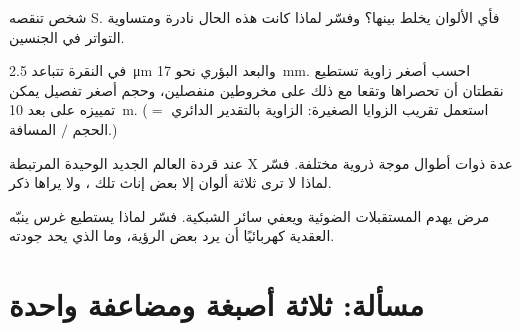 \begin{exercise}[$\star\star\star$]\label{exo:g11:the-eye:12}
شخص تنقصه  S. فأي الألوان يخلط بينها؟ وفسّر لماذا كانت هذه
الحال نادرة ومتساوية التواتر في الجنسين.
\end{exercise}

\begin{exercise}[$\star\star\star$]\label{exo:g11:the-eye:13}
 في النقرة تتباعد \qty{2.5}{\micro m} والبعد البؤري  نحو
\qty{17}{mm}. احسب أصغر زاوية تستطيع نقطتان أن تحصراها وتقعا مع ذلك
على مخروطين منفصلين، وحجم أصغر تفصيل يمكن تمييزه على بعد \qty{10}{m}.
(استعمل تقريب الزوايا الصغيرة: الزاوية بالتقدير الدائري $=$ الحجم $/$
المسافة.)
\end{exercise}

\begin{exercise}[$\star\star\star$]\label{exo:g11:the-eye:14}
عند قردة العالم الجديد   الوحيدة المرتبطة  X عدة
 ذوات أطوال موجة ذروية مختلفة. فسّر لماذا لا ترى ثلاثة ألوان إلا
بعض إناث تلك ، ولا يراها ذكر.
\end{exercise}

\begin{exercise}[$\star\star\star$]\label{exo:g11:the-eye:15}
مرض يهدم المستقبلات الضوئية ويعفي سائر الشبكية. فسّر لماذا يستطيع غرس
ينبّه  العقدية كهربائيًا أن يرد بعض الرؤية، وما الذي يحد جودته.
\end{exercise}

\section{مسألة: ثلاثة أصبغة ومضاعفة واحدة}

